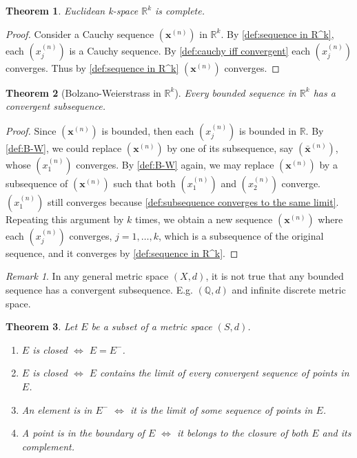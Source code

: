 \documentclass[12pt, lettersize]{article}
\theoremstyle{plain}
\newtheorem{thm}{Theorem}[section]
\theoremstyle{definition}
\theoremstyle{remark}
\newtheorem*{rem}{Remark}
\newcommand{\R}{\mathbb{R}}
\newcommand{\Q}{\mathbb{Q}}
\begin{document}
\begin{thm}
	Euclidean k-space $\mathbb{R}^k$ is complete.
\end{thm}
\begin{proof}
	Consider a Cauchy sequence $(\textbf{x}^{(n)})$ in $\mathbb{R}^k$. By \ref{def:sequence in R^k}, each $(x_j^{(n)})$ is a Cauchy sequence. By \ref{def:cauchy iff convergent} each $(x_j^{(n)})$ converges. Thus by \ref{def:sequence in R^k} $(\textbf{x}^{(n)})$ converges.
\end{proof}

\begin{thm}[Bolzano-Weierstrass in $\R^k$]
	Every bounded sequence in $\mathbb{R}^k$ has a convergent subsequence.
\end{thm}
\begin{proof}
	Since $(\textbf{x}^{(n)})$ is bounded, then each $(x_j^{(n)})$ is bounded in $\mathbb{R}$. By \ref{def:B-W}, we
	could replace $(\textbf{x}^{(n)})$ by one of its subsequence, say $(\bar{\mathbf{x}}^{(n)})$, whose $(x_1^{(n)})$
	converges. By \ref{def:B-W} again, we may replace $(\textbf{x}^{(n)})$ by a subsequence of $(\textbf{x}^{(n)})$ such
	that both $(x_1^{(n)})$ and $(x_2^{(n)})$ converge. $(x_1^{(n)})$ still converges because \ref{def:subsequence converges to the same limit}. Repeating this argument by $k$ times, we obtain a new sequence $(\textbf{x}^{(n)})$ where each $(x_j^{(n)})$ converges, $j=1,\dots,k$, which is a subsequence of the original sequence, and it converges by \ref{def:sequence in R^k}. 
\end{proof}
\begin{rem}
	In any general metric space $(X,d)$, it is not true that any bounded sequence has a convergent subsequence. E.g. $(\Q,d)$ and infinite discrete metric space.
\end{rem}

\begin{thm}
	Let $E$ be a subset of a metric space $(S,d)$.
	\begin{enumerate}
		\item $E$ is closed $\iff$ $E=E^-$.
		\item $E$ is closed $\iff$ $E$ contains the limit of every convergent sequence of points in $E$.
		\item An element is in $E^-$ $\iff$ it is the limit of some sequence of points in $E$.
		\item A point is in the boundary of $E$ $\iff$ it belongs to the closure of both $E$ and its complement.
	\end{enumerate}
\end{thm}
\end{document}
